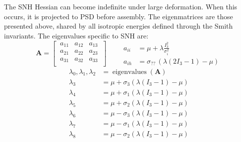 \documentclass{article}
\begin{document}
The SNH Hessian can become indefinite under large deformation. When this occurs, it is projected to PSD before assembly. The eigenmatrices are those presented above, shared by all isotropic energies defined through the Smith invariants. The eigenvalues specific to SNH are:
\begin{equation*}
    \mathbf{A} = 
    \begin{bmatrix}
        \ a_{11} & a_{12} & a_{13}\  \\
        \ a_{21} & a_{22} & a_{23}\  \\
        \ a_{31} & a_{32} & a_{33}\  \\
    \end{bmatrix} \qquad
    \begin{aligned}
        a_{ii} &= \mu + \lambda\frac{I_3^2}{\sigma_i^2} \\
        a_{ih} &= \sigma_{??}\,(\lambda(2I_3 - 1) - \mu)
    \end{aligned}
\end{equation*}
\begin{equation}
\begin{aligned}
    \lambda_0, \lambda_1, \lambda_2 &= \operatorname{eigenvalues}(\mathbf{A}) \\
    \lambda_3 &= \mu + \sigma_3 (\lambda(I_3 - 1) - \mu) \\
    \lambda_4 &= \mu + \sigma_1 (\lambda(I_3 - 1) - \mu) \\
    \lambda_5 &= \mu + \sigma_2 (\lambda(I_3 - 1) - \mu) \\
    \lambda_6 &= \mu - \sigma_3 (\lambda(I_3 - 1) - \mu) \\
    \lambda_7 &= \mu - \sigma_1 (\lambda(I_3 - 1) - \mu) \\
    \lambda_8 &= \mu - \sigma_2 (\lambda(I_3 - 1) - \mu) \\
\end{aligned}
\end{equation}
\end{document}
